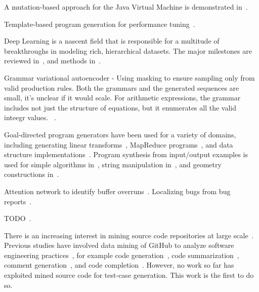 A mutation-based approach for the Java Virtual Machine is demonstrated in~\cite{Chena}.

Template-based program generation for performance tuning~\cite{Han2017}.


Deep Learning is a nascent field that is responsible for a multitude of breakthroughs in modeling rich, hierarchical datasets. The major milestones are reviewed in~\cite{Wang2017}, and methods in~\cite{Schmidhuber2014}.

Grammar variational autoencoder - Using masking to ensure sampling only from valid production rules. Both the grammars and the generated sequences are small, it's unclear if it would scale. For arithmetic expressions, the grammar includes not just the structure of equations, but it enumerates all the valid inteegr values. ~\cite{Kusner2017}.

Goal-directed program generators have been used for a variety of domains, including generating linear transforms~\cite{Voronenko2009}, MapReduce programs~\cite{Smith}, and data structure implementations~\cite{Loncaric2016}. Program synthesis from input/output examples is used for simple algorithms in~\cite{Zaremba2015a}, string manipulation in~\cite{Gulwani2011}, and geometry constructions in~\cite{Gulwani2012}.

Attention network to identify buffer overruns~\cite{Choi2016}. Localizing bugs from bug reports~\cite{Lam2016,Huo2016}.

TODO~\cite{White2016}.

There is an increasing interest in mining source code repositories at large scale~\cite{Allamanis2013a,White2015a,Bird2009}. Previous studies have involved data mining of GitHub to analyze software engineering practices~\cite{Wu2014,Guzman2014,Baishakhi2014a,Vasilescu2015}, for example code generation~\cite{Zhang2015a}, code summarization~\cite{Allamanis2016}, comment generation~\cite{Wong2013}, and code completion~\cite{Raychev2014}. However, no work so far has exploited mined source code for test-case generation. This work is the first to do so.
